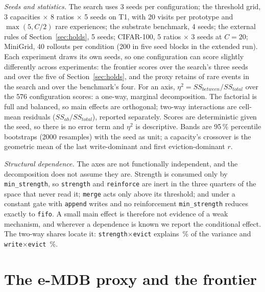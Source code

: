\documentclass[conference]{IEEEtran}
\begin{document}
\emph{Seeds and statistics.} The search uses 3 seeds per configuration; the
threshold grid, 3 capacities $\times$ 8 ratios $\times$ 5 seeds on T1, with 20
visits per prototype and $\max(5,C/2)$ rare experiences; the substrate
benchmark, 4 seeds; the external rules of Section~\ref{sec:holds}, 5 seeds;
CIFAR-100, 5 ratios $\times$ 3 seeds at $C=20$; MiniGrid, 40 rollouts per
condition (200 in five seed blocks in the extended run). Each experiment draws
its own seeds, so one configuration can score slightly differently across
experiments: the frontier scores
 over the search's three seeds
and 
over the five of Section~\ref{sec:holds}, and the proxy retains
 of rare events
in the search and
over the benchmark's four. For
an axis, $\eta^2 = SS_{between}/SS_{total}$ over the 576 configuration scores:
a one-way, marginal decomposition. The factorial is full and balanced, so main
effects are orthogonal; two-way interactions are cell-mean residuals
($SS_{ab}/SS_{total}$), reported separately. Scores are deterministic given the
seed, so there is no error term and $\eta^2$ is descriptive. Bands are 95\,\%
percentile bootstraps (2000 resamples) with the seed as unit; a capacity's
crossover is the geometric mean of the last write-dominant and first
eviction-dominant $r$.

\emph{Structural dependence.} The axes are not functionally independent, and
the decomposition does not assume they are. Strength is consumed only by
\texttt{min\_strength}, so \texttt{strength} and \texttt{reinforce} are inert in
the three quarters of the space that never read it; \texttt{merge} acts only
above its threshold; and under a constant gate with \texttt{append} writes and
no reinforcement \texttt{min\_strength} reduces exactly to \texttt{fifo}. A
small main effect is therefore not evidence of a weak mechanism, and wherever a
dependence is known we report the conditional effect. The two-way shares locate
it: \texttt{strength}$\times$\texttt{evict} explains
\,\% of the
variance and \texttt{write}$\times$\texttt{evict}
\,\%.

\section{The e-MDB proxy and the frontier}
\label{sec:frontier}
\end{document}
